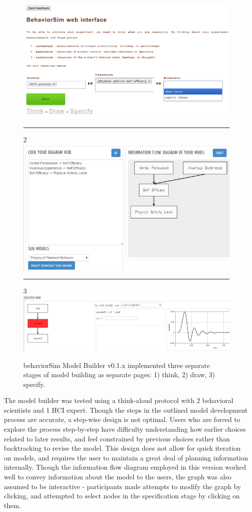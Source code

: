 \documentclass[conference]{IEEEtran}
\begin{document}
\begin{figure}[!t]
  \includegraphics[width=0.9\columnwidth]{img/v1-think}
  \rule{\columnwidth}{0.4pt}
  2
  \includegraphics[width=0.9\columnwidth]{img/v1-draw}
  \rule{\columnwidth}{0.4pt}
  3
  \includegraphics[width=0.9\columnwidth]{img/v1-specify}  
  \caption{behaviorSim Model Builder v0.1.x implemented three separate stages of model building as separate pages: 1) think, 2) draw, 3) specify.}
  \label{model-builder-v1}
\end{figure}

The model builder was tested using a think-aloud protocol with 2 behavioral scientists and 1 HCI expert. 
Though the steps in the outlined model development process are accurate, a step-wise design is not optimal.
Users who are forced to explore the process step-by-step have difficulty understanding how earlier choices related to later results, and feel constrained by previous choices rather than backtracking to revise the model.
This design does not allow for quick iteration on models, and requires the user to maintain a great deal of planning information internally.
Though the information flow diagram employed in this version worked well to convey information about the model to the users, the graph was also assumed to be interactive - participants made attempts to modify the graph by clicking, and attempted to select nodes in the specification stage by clicking on them.
\end{document}
